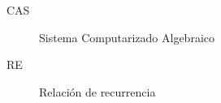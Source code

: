 
\begin{description}%
	\item[CAS]{Sistema Computarizado Algebraico}
	\item[RE]{Relación de recurrencia}
\end{description}
